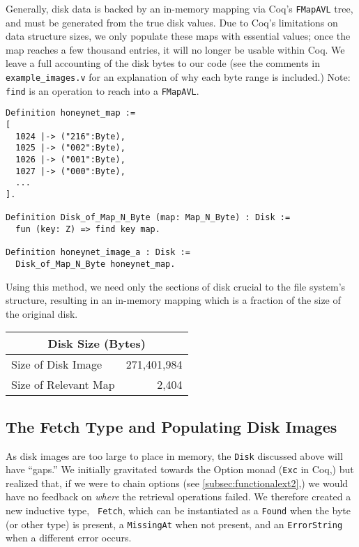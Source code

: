 \documentclass[nocopyrightspace,preprint]{sigplanconf}
\begin{document}
Generally, disk data is backed by an in-memory mapping via Coq's {\tt FMapAVL}
tree, and must be generated from the true disk values. Due to Coq's
limitations on data structure sizes, we only populate these maps with
essential values; once the map reaches a few thousand entries, it will no
longer be usable within Coq. We leave a full accounting of the disk bytes to
our code (see the comments in {\tt example\_images.v} for an explanation of
why each byte range is included.) Note: {\tt find} is an operation to reach
into a {\tt FMapAVL}.

\begin{lstlisting}
Definition honeynet_map := 
[ 
  1024 |-> ("216":Byte), 
  1025 |-> ("002":Byte),
  1026 |-> ("001":Byte), 
  1027 |-> ("000":Byte), 
  ...
].

Definition Disk_of_Map_N_Byte (map: Map_N_Byte) : Disk :=
  fun (key: Z) => find key map.

Definition honeynet_image_a : Disk := 
  Disk_of_Map_N_Byte honeynet_map.
\end{lstlisting}

Using this method, we need only the sections of disk crucial to the file
system's structure, resulting in an in-memory mapping which is a fraction of
the size of the original disk.

\begin{center}
  \begin{tabular}{|l|r|}
    \hline
    \multicolumn{2}{|c|}{Disk Size (Bytes)}\\
    \hline
    Size of Disk Image    & 271,401,984\\
    Size of Relevant Map  & 2,404\\
    \hline
  \end{tabular}
\end{center}

\subsection{The Fetch Type and Populating Disk Images}
\label{subsec:fetch}

As disk images are too large to place in memory, the {\tt Disk} discussed
above will have ``gaps.'' We initially gravitated towards the Option monad
({\tt Exc} in Coq,) but realized that, if we were to chain options (see
\ref{subsec:functionalext2},) we would have no feedback on {\em where} the
retrieval operations failed. We therefore created a new inductive type, {\tt
Fetch}, which can be instantiated as a {\tt Found} when the byte (or other
type) is present, a {\tt MissingAt} when not present, and an {\tt ErrorString}
when a different error occurs.
\end{document}
